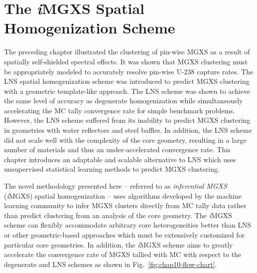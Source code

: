 \chapter{The \textit{i}MGXS Spatial Homogenization Scheme}
\label{chap:unsupervised}

The preceding chapter illustrated the clustering of pin-wise \ac{MGXS} as a result of spatially self-shielded spectral effects. It was shown that \ac{MGXS} clustering must be appropriately modeled to accurately resolve pin-wise U-238 capture rates. The \ac{LNS} spatial homogenization scheme was introduced to predict \ac{MGXS} clustering with a geometric template-like approach. The \ac{LNS} scheme was shown to achieve the same level of accuracy as degenerate homogenization while simultaneously accelerating the \ac{MC} tally convergence rate for simple benchmark problems. However, the \ac{LNS} scheme suffered from its inability to predict \ac{MGXS} clustering in geometries with water reflectors and steel baffles. In addition, the \ac{LNS} scheme did not scale well with the complexity of the core geometry, resulting in a large number of materials and thus an under-accelerated convergence rate. This chapter introduces an adaptable and scalable alternative to \ac{LNS} which uses unsupervised statistical learning methods to predict \ac{MGXS} clustering.

The novel methodology presented here -- referred to as \textit{inferential \ac{MGXS}} (\textit{i}\ac{MGXS}) spatial homogenization -- uses algorithms developed by the machine learning community to infer \ac{MGXS} clusters directly from \ac{MC} tally data rather than predict clustering from an analysis of the core geometry. The \textit{i}\ac{MGXS} scheme can flexibly accommodate arbitrary core heterogeneities better than \ac{LNS} or other geometric-based approaches which must be extensively customized for particular core geometries. In addition, the \textit{i}\ac{MGXS} scheme aims to greatly accelerate the convergence rate of \ac{MGXS} tallied with \ac{MC} with respect to the degenerate and \ac{LNS} schemes as shown in Fig.~\ref{fig:chap10-flow-chart}.


